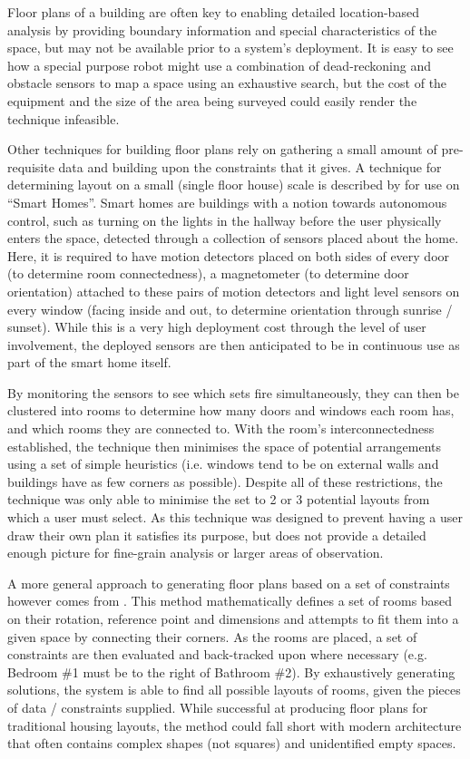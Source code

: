 \documentclass{UoYCSproject}
\begin{document}
            Floor plans of a building are often key to enabling detailed location-based analysis by providing boundary information and special characteristics of the space, but may not be available prior to a system's deployment. It is easy to see how a special purpose robot might use a combination of dead-reckoning and obstacle sensors to map a space using an exhaustive search, but the cost of the equipment and the size of the area being surveyed could easily render the technique infeasible.
            
            Other techniques for building floor plans rely on gathering a small amount of pre-requisite data and building upon the constraints that it gives. A technique for determining layout on a small (single floor house) scale is described by \citet{lu2012smart} for use on ``Smart Homes''. Smart homes are buildings with a notion towards autonomous control, such as turning on the lights in the hallway before the user physically enters the space, detected through a collection of sensors placed about the home. Here, it is required to have motion detectors placed on both sides of every door (to determine room connectedness), a magnetometer (to determine door orientation) attached to these pairs of motion detectors and light level sensors on every window (facing inside and out, to determine orientation through sunrise / sunset). While this is a very high deployment cost through the level of user involvement, the deployed sensors are then anticipated to be in continuous use as part of the smart home itself.
            
            By monitoring the sensors to see which sets fire simultaneously, they can then be clustered into rooms to determine how many doors and windows each room has, and which rooms they are connected to. With the room's interconnectedness established, the technique then minimises the space of potential arrangements using a set of simple heuristics (i.e. windows tend to be on external walls and buildings have as few corners as possible). Despite all of these restrictions, the technique was only able to minimise the set to 2 or 3 potential layouts from which a user must select. As this technique was designed to prevent having a user draw their own plan it satisfies its purpose, but does not provide a detailed enough picture for fine-grain analysis or larger areas of observation.
            
            A more general approach to generating floor plans based on a set of constraints however comes from \citet{charman1994constraint}. This method mathematically defines a set of rooms based on their rotation, reference point and dimensions and attempts to fit them into a given space by connecting their corners. As the rooms are placed, a set of constraints are then evaluated and back-tracked upon where necessary (e.g. Bedroom \#1 must be to the right of Bathroom \#2). By exhaustively generating solutions, the system is able to find all possible layouts of rooms, given the pieces of data / constraints supplied. While successful at producing floor plans for traditional housing layouts, the method could fall short with modern architecture that often contains complex shapes (not squares) and unidentified empty spaces.
            
\end{document}
